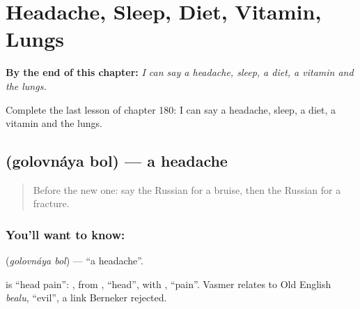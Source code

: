 
\chapter{Headache, Sleep, Diet, Vitamin, Lungs}
\label{ch:ru-headache-sleep-diet-vitamin-lungs}

\begin{chapteropening}
\textbf{By the end of this chapter:} \emph{I can say a headache, sleep, a diet, a vitamin and the lungs.}

Complete the last lesson of chapter 180: I can say a headache, sleep, a diet, a vitamin and the lungs.
\end{chapteropening}

\section[\texorpdfstring{\ru{головная} \ru{боль} (golovnáya bol)}{головная боль (golovnáya bol)}]{  (golovnáya bol) — a headache}

\label{lesson:RU-C180-golovnaya-bol}



\begin{quote}
Before the new one: say the Russian for a bruise, then the Russian for a fracture.
\end{quote}

\subsection*{You'll want to know:  }
\textbf{ } (\emph{golovnáya bol}) — \textquotedblleft{}a headache\textquotedblright{}.

\begin{cousinweb}
\textbf{ } is \textquotedblleft{}head pain\textquotedblright{}: \emph{}, from \emph{}, \textquotedblleft{}head\textquotedblright{}, with \emph{}, \textquotedblleft{}pain\textquotedblright{}. Vasmer relates \emph{} to Old English \emph{bealu}, \textquotedblleft{}evil\textquotedblright{}, a link Berneker rejected.
\end{cousinweb}

